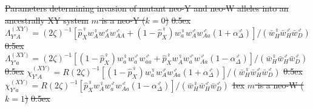 \documentclass[10pt,letterpaper]{article}
\providecommand{\DIFdel}[1]{{\protect\color{red}\sout{#1}}}                      %
\providecommand{\DIFdelFL}[1]{\DIFdel{#1}} %
\begin{document}
{%
\DIFdelFL{Parameters determining invasion of mutant neo-Y and neo-W alleles into an ancestrally XY system}%
}
\DIFdelFL{$m$ is a neo-Y ($k=0$) }%
\DIFdelFL{0.5ex}%
\DIFdelFL{$\Lambda_{Y'A}^{(XY)} = {\left( 2 \zeta \right)}^{-1} \left[\hat{p}_X^\female w_{A}^{\female} w_{A}^{\male} w_{AA}^{\male} + (1-\hat{p}_X^\female) w_{a}^{\female} w_{A}^{\male} w_{Aa}^{\male} (1+\alpha_{\Delta}^{\male}) \right]/ \left( \bar{w}_H^\female \bar{w}_H^\male \bar{w}^{\male}_{D} \right) $}%
\DIFdelFL{0.5ex}%
\DIFdelFL{$\Lambda_{Y'a}^{(XY)} = {\left( 2 \zeta \right)}^{-1} \left[(1-\hat{p}_X^\female) w_{a}^{\female} w_{a}^{\male} w_{aa}^{\male} + \hat{p}_X^\female w_{A}^{\female} w_{a}^{\male} w_{Aa}^{\male}(1 - \alpha_{\Delta}^{\male}) \right]/ \left( \bar{w}_H^\female \bar{w}_H^\male \bar{w}^{\male}_{D} \right) $ }%
\DIFdelFL{0.5ex}%
\DIFdelFL{$\chi_{Y'A}^{(XY)} = R {\left( 2 \zeta \right)}^{-1} \left[ (1-\hat{p}_X^\female) w_{a}^{\female} w_{A}^{\male} w_{Aa}^{\male} (1+\alpha_{\Delta}^{\male}) \right]/  \left( \bar{w}_H^\female \bar{w}_H^\male \bar{w}^{\male}_{D} \right)   $}%
\DIFdelFL{0.5ex}%
\DIFdelFL{$\chi_{Y'a}^{(XY)} = R {\left( 2 \zeta \right)}^{-1} \left[   \hat{p}_X^\female w_{A}^{\female} w_{a}^{\male} w_{Aa}^{\male} (1 - \alpha_\Delta^{\male}) \right]/ \left( \bar{w}_H^\female \bar{w}_H^\male \bar{w}^{\male}_{D} \right)  $}%
\DIFdelFL{1ex}%
\DIFdelFL{$m$ is a neo-W ($k=1$) }%
\DIFdelFL{0.5ex}%
\end{document}

